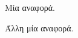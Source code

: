 \documentclass[report.tex]{subfiles}
\begin{document}
\begin{myreferences}{10}

Μία αναφορά.

Άλλη μία αναφορά.

\end{myreferences}
\end{document}
